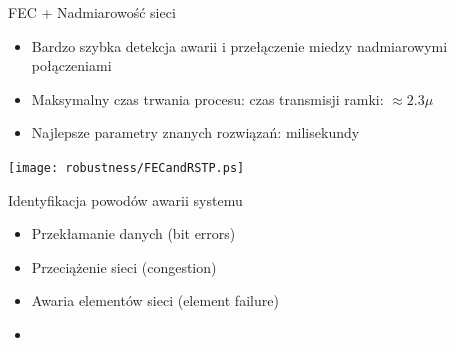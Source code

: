 \documentclass[compress,red]{beamer}
\begin{document}
\begin{frame}{FEC + Nadmiarowość sieci}

  \begin{itemize}
    \item Bardzo szybka detekcja awarii i przełączenie miedzy nadmiarowymi połączeniami
    \item Maksymalny czas trwania procesu: czas transmisji ramki: $\approx 2.3 \mu$
    \item Najlepsze parametry znanych rozwiązań: milisekundy
  \end{itemize}

      \begin{center}
      \texttt{[image: robustness/FECandRSTP.ps]}
      \end{center}


\end{frame}
\begin{frame}{Identyfikacja powodów awarii systemu}


  \begin{itemize}
    \item Przekłamanie danych (bit errors)
    \item Przeciążenie sieci (congestion)
    \item Awaria elementów sieci (element failure)
    \item {}
  \end{itemize}

\end{frame}
\end{document}
